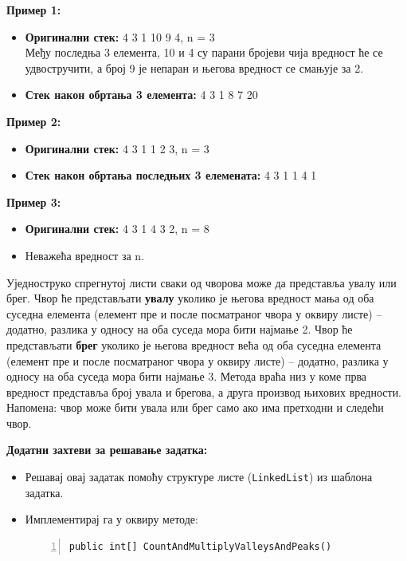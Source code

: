 \textbf{Пример 1:}
\begin{itemize}
    \item \textbf{Оригинални стек:} 4 3 1 10 9 4, n = 3 \\
    Међу последња 3 елемента, 10 и 4 су парани бројеви чија вредност ће се удвостручити, а број 9 је непаран и његова вредност се смањује за 2.
    \item \textbf{Стек након обртања 3 елемента:} 4 3 1 8 7 20
\end{itemize}

\textbf{Пример 2:}
\begin{itemize}
    \item \textbf{Оригинални стек:} 4 3 1 1 2 3, n = 3
    \item \textbf{Стек након обртања последњих 3 елемената:} 4 3 1 1 4 1
\end{itemize}

\textbf{Пример 3:}
\begin{itemize}
    \item \textbf{Оригинални стек:} 4 3 1 4 3 2, n = 8
    \item Неважећа вредност за n.
\end{itemize}



Уједноструко спрегнутој листи сваки од чворова може да представља увалу или брег. Чвор ће представљати \textbf{увалу} уколико је његова вредност мања од оба суседна елемента (елемент пре и после посматраног чвора у оквиру листе) – додатно, разлика у односу на оба суседа мора бити најмање 2. Чвор ће представљати \textbf{брег} уколико је његова вредност већа од оба суседна елемента (елемент пре и после посматраног чвора у оквиру листе) – додатно, разлика у односу на оба суседа мора бити најмање 3. Метода враћа низ у коме прва вредност представља број увала и брегова, а друга производ њихових вредности. Напомена: чвор може бити увала или брег само ако има претходни и следећи чвор.

\textbf{Додатни захтеви за решавање задатка:}
\begin{itemize}
    \item Решавај овај задатак помоћу структуре листе (\texttt{LinkedList}) из шаблона задатка.
    \item Имплементирај га у оквиру методе:
    \begin{Verbatim}[fontsize=\footnotesize, numbers=left, xleftmargin=10mm]
public int[] CountAndMultiplyValleysAndPeaks()
    \end{Verbatim}
\end{itemize}

